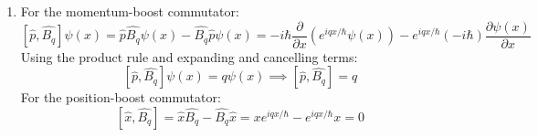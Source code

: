 \begin{sol}
\begin{enumerate}[label=\textbf{(\alph*)}]
\item For the momentum-boost commutator: $$[\hat{p}, \hat{B_q}]\psi(x) = \hat{p}\hat{B_q}\psi(x) - \hat{B_q}\hat{p}\psi(x) = -i\hbar\frac{\partial}{\partial x}\left(e^{iqx/\hbar}\psi(x)\right) - e^{iqx/\hbar}(-i\hbar)\frac{\partial\psi(x)}{\partial x}$$ Using the product rule and expanding and cancelling terms: $$[\hat{p}, \hat{B_q}]\psi(x) = q\psi(x) \implies [\hat{p}, \hat{B_q}] = q$$ For the position-boost commutator: $$[\hat{x}, \hat{B_q}] = \hat{x}\hat{B_q} - \hat{B_q}\hat{x} = xe^{iqx/\hbar} - e^{iqx/\hbar}x = 0$$
\end{enumerate}
\end{sol}